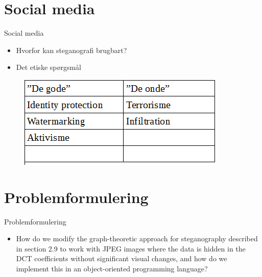 \section{Social media}
\begin{frame}{Social media}{}
	\begin{itemize}
		\item Hvorfor kan steganografi brugbart?
		\item Det etiske spørgsmål
	\end{itemize}
	\begin{figure}[!H]
			\centering
			\includegraphics[width=.55\textwidth]{./Tessa/tabel.png}
	\end{figure}
\end{frame}

\section{Problemformulering}
\begin{frame}{Problemformulering}{}
	\begin{itemize}
		\item How do we modify the graph-theoretic approach for steganography described in section 2.9 to work with JPEG images where the data is hidden in the DCT coefficients without significant visual changes, and how do we implement this in an object-oriented programming language?
	\end{itemize}
\end{frame}
